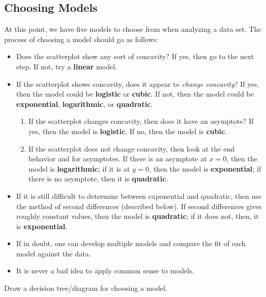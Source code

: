 \documentclass[notes]{subfiles}
\begin{document}
	\subsection*{Choosing Models}
		At this point, we have five models to choose from when analyzing a data set.  The process of choosing a model should go as follows:
		\begin{itemize}
			\item Does the scatterplot show any sort of concavity?  If yes, then go to the next step.  If not, try a \textbf{linear} model.
			\item If the scatterplot shows concavity, does it appear to \emph{change concavity}? If yes, then the model could be \textbf{logistic} or \textbf{cubic}.  If not, then the model could be \textbf{exponential}, \textbf{logarithmic}, or \textbf{quadratic}.
			\begin{enumerate}
				\item If the scatterplot changes concavity, then does it have an asymptote? If yes, then the model is \textbf{logistic}.  If no, then the model is \textbf{cubic}.
				\item If the scatterplot does not change concavity, then look at the end behavior and for asymptotes.  If there is an asymptote at $x = 0$, then the model is \textbf{logarithmic}; if it is at $y = 0$, then the model is \textbf{exponential}; if there is no asymptote, then it is \textbf{quadratic}.
			\end{enumerate}
		\item If it is still difficult to determine between exponential and quadratic, then use the method of second differences (described below).  If second differences gives roughly constant values, then the model is \textbf{quadratic}; if it does not, then, it is \textbf{exponential}.
		\item If in doubt, one can develop multiple models and compare the fit of each model against the data.
		\item It is never a bad idea to apply common sense to models.
		\end{itemize}
			\newpage
		\begin{ex}
			Draw a decision tree/diagram for choosing a model.
		\end{ex}
		
\end{document}
